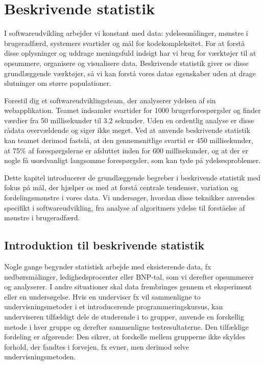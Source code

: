 \chapter{Beskrivende statistik}
\label{chap:ch6}

I softwareudvikling arbejder vi konstant med data: ydelsesmålinger, mønstre i brugeradfærd, systemers svartider og mål for kodekompleksitet. For at forstå disse oplysninger og uddrage meningsfuld indsigt har vi brug for værktøjer til at opsummere, organisere og visualisere data. Beskrivende statistik giver os disse grundlæggende værktøjer, så vi kan forstå vores datas egenskaber uden at drage slutninger om større populationer.

Forestil dig et softwareudviklingsteam, der analyserer ydelsen af sin webapplikation. Teamet indsamler svartider for 1000 brugerforespørgsler og finder værdier fra 50 millisekunder til 3.2 sekunder. Uden en ordentlig analyse er disse rådata overvældende og siger ikke meget. Ved at anvende beskrivende statistik kan teamet derimod fastslå, at den gennemsnitlige svartid er 450 millisekunder, at 75\% af forespørgslerne er afsluttet inden for 600 millisekunder, og at der er nogle få usædvanligt langsomme forespørgsler, som kan tyde på ydelsesproblemer.

Dette kapitel introducerer de grundlæggende begreber i beskrivende statistik med fokus på mål, der hjælper os med at forstå centrale tendenser, variation og fordelingsmønstre i vores data. Vi undersøger, hvordan disse teknikker anvendes specifikt i softwareudvikling, fra analyse af algoritmers ydelse til forståelse af mønstre i brugeradfærd.

\section{Introduktion til beskrivende statistik} \label{sec:ch6sec1}

Nogle gange begynder statistisk arbejde med eksisterende data, fx nedbørsmålinger, ledighedsprocenter eller BNP-tal, som vi derefter opsummerer og analyserer. I andre situationer skal data frembringes gennem et eksperiment eller en undersøgelse. Hvis en underviser fx vil sammenligne to undervisningsmetoder i et introducerende programmeringskursus, kan underviseren tilfældigt dele de studerende i to grupper, anvende en forskellig metode i hver gruppe og derefter sammenligne testresultaterne. Den tilfældige fordeling er afgørende: Den sikrer, at forskelle mellem grupperne ikke skyldes forhold, der fandtes i forvejen, fx evner, men derimod selve undervisningsmetoden.  

